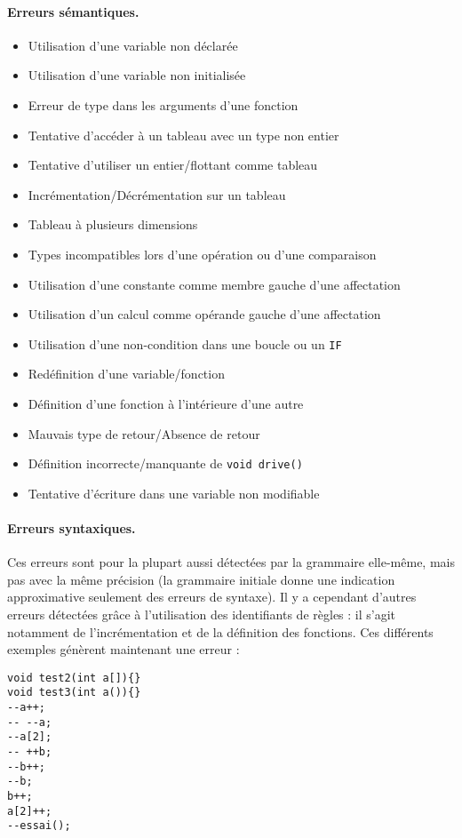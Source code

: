 \documentclass[a4paper,10pt]{article}
\begin{document}
\paragraph{Erreurs sémantiques.} 
\begin{itemize}
\item Utilisation d'une variable non déclarée
\item Utilisation d'une variable non initialisée
\item Erreur de type dans les arguments d'une fonction
\item Tentative d'accéder à un tableau avec un type non entier
\item Tentative d'utiliser un entier/flottant comme tableau
\item Incrémentation/Décrémentation sur un tableau
\item Tableau à plusieurs dimensions
\item Types incompatibles lors d'une opération ou d'une comparaison
\item Utilisation d'une constante comme membre gauche d'une affectation
\item Utilisation d'un calcul comme opérande gauche d'une affectation
\item Utilisation d'une non-condition dans une boucle ou un \verb!IF!
\item Redéfinition d'une variable/fonction
\item Définition d'une fonction à l'intérieure d'une autre
\item Mauvais type de retour/Absence de retour
\item Définition incorrecte/manquante de \verb!void drive()!
\item Tentative d'écriture dans une variable non modifiable
\end{itemize}

\paragraph{Erreurs syntaxiques.}
Ces erreurs sont pour la plupart aussi détectées par la grammaire elle-même, mais pas avec la même précision (la grammaire initiale donne une indication approximative seulement des erreurs de syntaxe). Il y a cependant d'autres erreurs détectées grâce à l'utilisation des identifiants de règles : il s'agit notamment de l'incrémentation et de la définition des fonctions. Ces différents exemples génèrent maintenant une erreur :

\begin{verbatim}
void test2(int a[]){}
void test3(int a()){}
--a++; 
-- --a; 
--a[2];
-- ++b;
--b++; 
--b;
b++;
a[2]++; 
--essai(); 
\end{verbatim}
\end{document}
